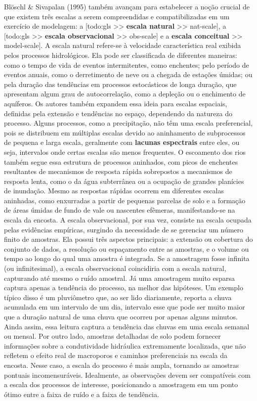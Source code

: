 \documentclass[./main.tex]{subfiles}
\begin{document}
\par Blöschl \& Sivapalan (1995) também avançam para estabelecer a noção crucial de que existem três escalas a serem compreendidas e compatibilizadas em um exercício de modelagem: a [todo:gls >> \textbf{escala natural} >> nat-scale], a [todo:gls >> \textbf{escala observacional} >> obs-scale] e a \textbf{escala conceitual} >> model-scale]. A escala natural refere-se à velocidade característica real exibida pelos processos hidrológicos. Ela pode ser classificada de diferentes maneiras: como o tempo de vida de eventos intermitentes, como enchentes; pelo período de eventos anuais, como o derretimento de neve ou a chegada de estações úmidas; ou pela duração das tendências em processos estocásticos de longa duração, que apresentam algum grau de autocorrelação, como a depleção ou o enchimento de aquíferos. Os autores também expandem essa ideia para escalas espaciais, definidas pela extensão e tendências no espaço, dependendo da natureza do processo. Alguns processos, como a precipitação, não têm uma escala preferencial, pois se distribuem em múltiplas escalas devido ao aninhamento de subprocessos de pequena e larga escala, geralmente com \textbf{lacunas espectrais} entre eles, ou seja, intervalos onde certas escalas são menos frequentes. O escoamento dos rios também segue essa estrutura de processos aninhados, com picos de enchentes resultantes de mecanismos de resposta rápida sobrepostos a mecanismos de resposta lenta, como o da água subterrânea ou a ocupação de grandes planícies de inundação. Mesmo as respostas rápidas ocorrem em diferentes escalas aninhadas, como enxurradas a partir de pequenas parcelas de solo e a formação de áreas úmidas de fundo de vale ou nascentes efêmeras, manifestando-se na escala da encosta. A escala observacional, por sua vez, consiste na escala ocupada pelas evidências empíricas, surgindo da necessidade de se gerenciar um número finito de amostras. Ela possui três aspectos principais: a extensão ou cobertura do conjunto de dados, a resolução ou espaçamento entre as amostras, e o volume ou tempo ao longo do qual uma amostra é integrada. Se a amostragem fosse infinita (ou infinitesimal), a escala observacional coincidiria com a escala natural, capturando até mesmo o ruído amostral. Já uma amostragem muito esparsa captura apenas a tendência do processo, na melhor das hipóteses. Um exemplo típico disso é um pluviômetro que, ao ser lido diariamente, reporta a chuva acumulada em um intervalo de um dia, intervalo esse que pode ser muito maior que a duração natural de uma chuva que ocorreu por apenas alguns minutos. Ainda assim, essa leitura captura a tendência das chuvas em uma escala semanal ou mensal. Por outro lado, amostras detalhadas de solo podem fornecer informações sobre a condutividade hidráulica extremamente localizada, que não refletem o efeito real de macroporos e caminhos preferenciais na escala da encosta. Nesse caso, a escala do processo é mais ampla, tornando as amostras pontuais incomensuráveis. Idealmente, as observações devem ser compatíveis com a escala dos processos de interesse, posicionando a amostragem em um ponto ótimo entre a faixa de ruído e a faixa de tendência. 
\end{document}
